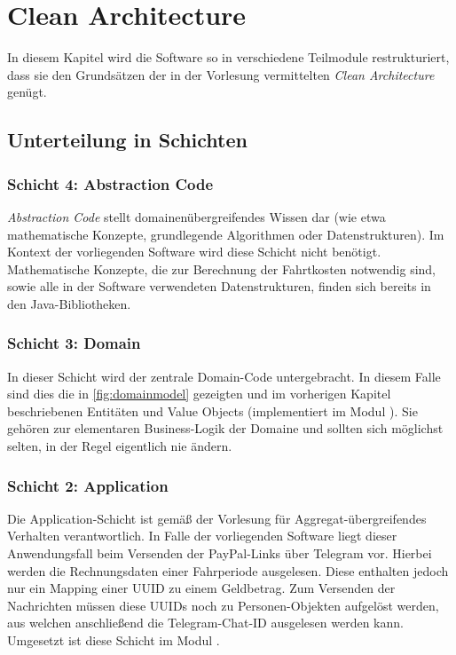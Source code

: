 \chapter{Clean Architecture}
In diesem Kapitel wird die Software so in verschiedene Teilmodule restrukturiert, dass sie den Grundsätzen der in der Vorlesung vermittelten \emph{Clean Architecture} genügt.

\section{Unterteilung in Schichten}
\subsection{Schicht 4: Abstraction Code}
\emph{Abstraction Code} stellt domainenübergreifendes Wissen dar (wie etwa mathematische Konzepte, grundlegende Algorithmen oder Datenstrukturen).
Im Kontext der vorliegenden Software wird diese Schicht nicht benötigt.
Mathematische Konzepte, die zur Berechnung der Fahrtkosten notwendig sind, sowie alle in der Software verwendeten Datenstrukturen, finden sich bereits in den Java-Bibliotheken.

\subsection{Schicht 3: Domain}
In dieser Schicht wird der zentrale Domain-Code untergebracht.
In diesem Falle sind dies die in \autoref{fig:domainmodel} gezeigten und im vorherigen Kapitel beschriebenen Entitäten und Value Objects (implementiert im Modul \href{https://github.com/yschiebelhut/carpool-java/tree/b572f3aabe01f91462d00f1469b7c1da3266873b/3-carpool-java-domain}{}).
Sie gehören zur elementaren Business-Logik der Domaine und sollten sich möglichst selten, in der Regel eigentlich nie ändern.

\subsection{Schicht 2: Application}
Die Application-Schicht ist gemäß der Vorlesung für Aggregat-übergreifendes Verhalten verantwortlich.
In Falle der vorliegenden Software liegt dieser Anwendungsfall beim Versenden der PayPal-Links über Telegram vor.
Hierbei werden die Rechnungsdaten einer Fahrperiode ausgelesen.
Diese enthalten jedoch nur ein Mapping einer UUID zu einem Geldbetrag.
Zum Versenden der Nachrichten müssen diese UUIDs noch zu Personen-Objekten aufgelöst werden, aus welchen anschließend die Telegram-Chat-ID ausgelesen werden kann.
Umgesetzt ist diese Schicht im Modul \href{https://github.com/yschiebelhut/carpool-java/tree/b572f3aabe01f91462d00f1469b7c1da3266873b/2-carpool-java-application}{}.

